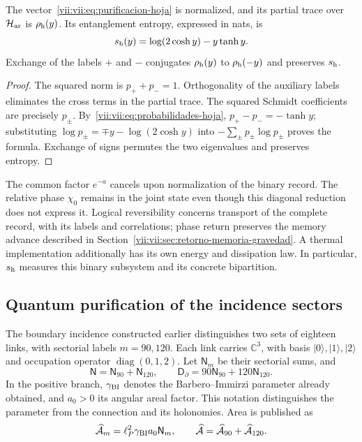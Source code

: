 \begin{proposition}
\label{vii:vii:prop:purificacion-hoja}
The vector~\eqref{vii:vii:eq:purificacion-hoja} is normalized, and its partial
trace over \(\mathcal H_{\rm ar}\) is \(\rho_{\rm h}(y)\).
Its entanglement entropy, expressed in nats, is
\begin{equation}
 s_{\rm h}(y)=\log(2\cosh y)-y\tanh y.
 \label{vii:vii:eq:entropia-hoja}
\end{equation}
Exchange of the labels \(+\) and \(-\) conjugates
\(\rho_{\rm h}(y)\) to \(\rho_{\rm h}(-y)\) and preserves
\(s_{\rm h}\).
\end{proposition}
\begin{proof}
The squared norm is \(p_++p_-=1\). Orthogonality of the
auxiliary labels eliminates the cross terms in the partial trace.
The squared Schmidt coefficients are precisely \(p_\pm\).
By~\eqref{vii:vii:eq:probabilidades-hoja},
\(p_+-p_-=-\tanh y\); substituting
\(\log p_\pm=\mp y-\log(2\cosh y)\) into
\(-\sum_\pm p_\pm\log p_\pm\) proves the formula.
Exchange of signs permutes the two eigenvalues and preserves entropy.
\end{proof}

The common factor \(e^{-a}\) cancels upon normalization of the binary record.
The relative phase \(\chi_0\) remains in the joint state even though this
diagonal reduction does not express it. Logical reversibility concerns
transport of the complete record, with its labels and correlations;
phase return preserves the memory advance described in
Section~\ref{vii:vii:sec:retorno-memoria-gravedad}. A thermal implementation
additionally has its own energy and dissipation law. In particular,
\(s_{\rm h}\) measures this binary subsystem and its concrete bipartition.

\subsection{Quantum purification of the incidence sectors}
\label{vii:vii:subsec:purificacion-sectorial}

The boundary incidence constructed earlier distinguishes two sets
of eighteen links, with sectorial labels \(m=90,120\). Each link
carries \(\mathbb C^3\), with basis \(|0\rangle,|1\rangle,|2\rangle\)
and occupation operator \(\operatorname{diag}(0,1,2)\). Let
\(\mathsf N_m\) be their sectorial sums, and
\begin{equation}
 \mathsf N=\mathsf N_{90}+\mathsf N_{120},\qquad
 \mathsf D_\partial=90\mathsf N_{90}+120\mathsf N_{120}.
 \label{vii:vii:eq:ocupaciones-sectoriales}
\end{equation}
In the positive branch, \(\gamma_{\rm BI}\) denotes the Barbero--Immirzi
parameter already obtained, and \(a_0>0\) its angular areal factor.
This notation distinguishes the parameter from the connection and its holonomies.
Area is published as
\begin{equation}
 \widehat{\mathcal A}_m=\ell_P^2\gamma_{\rm BI}a_0\mathsf N_m,
 \qquad
 \widehat{\mathcal A}=\widehat{\mathcal A}_{90}
                         +\widehat{\mathcal A}_{120}.
 \label{vii:vii:eq:area-sectores}
\end{equation}

